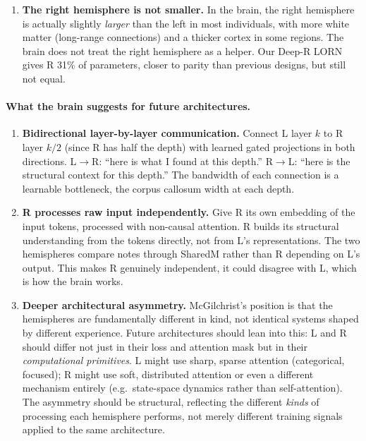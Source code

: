\documentclass[11pt, a4paper]{article}
\theoremstyle{plain}
\theoremstyle{definition}
\theoremstyle{remark}
\begin{document}
\begin{enumerate}[nosep]
\item \textbf{The right hemisphere is not smaller.}
In the brain, the right hemisphere is actually slightly \emph{larger} than the left in most individuals, with more white matter (long-range connections) and a thicker cortex in some regions.
The brain does not treat the right hemisphere as a helper.
Our Deep-R LORN gives R 31\% of parameters, closer to parity than previous designs, but still not equal.
\end{enumerate}

\paragraph{What the brain suggests for future architectures.}

\begin{enumerate}[nosep]
\item \textbf{Bidirectional layer-by-layer communication.}
Connect L layer $k$ to R layer $k/2$ (since R has half the depth) with learned gated projections in both directions.
L$\to$R: ``here is what I found at this depth.''
R$\to$L: ``here is the structural context for this depth.''
The bandwidth of each connection is a learnable bottleneck, the corpus callosum width at each depth.

\item \textbf{R processes raw input independently.}
Give R its own embedding of the input tokens, processed with non-causal attention.
R builds its structural understanding from the tokens directly, not from L's representations.
The two hemispheres compare notes through SharedM rather than R depending on L's output.
This makes R genuinely independent, it could disagree with L, which is how the brain works.

\item \textbf{Deeper architectural asymmetry.}
McGilchrist's position is that the hemispheres are fundamentally different in kind, not identical systems shaped by different experience.
Future architectures should lean into this: L and R should differ not just in their loss and attention mask but in their \emph{computational primitives}.
L might use sharp, sparse attention (categorical, focused); R might use soft, distributed attention or even a different mechanism entirely (e.g.\ state-space dynamics rather than self-attention).
The asymmetry should be structural, reflecting the different \emph{kinds} of processing each hemisphere performs, not merely different training signals applied to the same architecture.


\end{enumerate}
\end{document}
